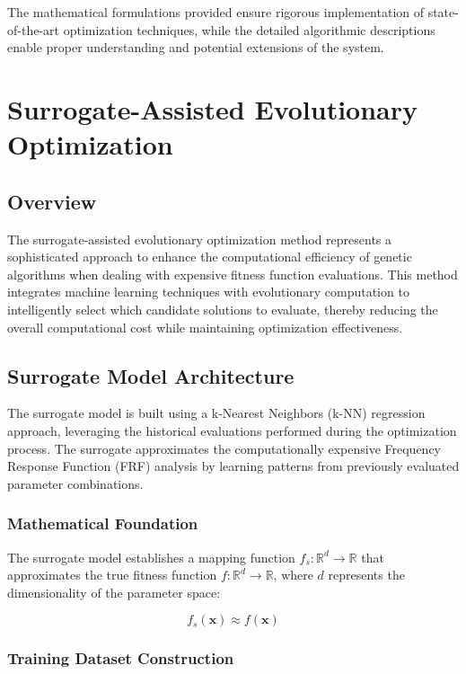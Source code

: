 \documentclass[12pt,a4paper]{article}
\begin{document}
The mathematical formulations provided ensure rigorous implementation of state-of-the-art optimization techniques, while the detailed algorithmic descriptions enable proper understanding and potential extensions of the system.

\section{Surrogate-Assisted Evolutionary Optimization}

\subsection{Overview}

The surrogate-assisted evolutionary optimization method represents a sophisticated approach to enhance the computational efficiency of genetic algorithms when dealing with expensive fitness function evaluations. This method integrates machine learning techniques with evolutionary computation to intelligently select which candidate solutions to evaluate, thereby reducing the overall computational cost while maintaining optimization effectiveness.

\subsection{Surrogate Model Architecture}

The surrogate model is built using a k-Nearest Neighbors (k-NN) regression approach, leveraging the historical evaluations performed during the optimization process. The surrogate approximates the computationally expensive Frequency Response Function (FRF) analysis by learning patterns from previously evaluated parameter combinations.

\subsubsection{Mathematical Foundation}

The surrogate model establishes a mapping function $f_s: \mathbb{R}^d \rightarrow \mathbb{R}$ that approximates the true fitness function $f: \mathbb{R}^d \rightarrow \mathbb{R}$, where $d$ represents the dimensionality of the parameter space:

\begin{equation}
f_s(\mathbf{x}) \approx f(\mathbf{x})
\end{equation}

\subsubsection{Training Dataset Construction}
\end{document}
